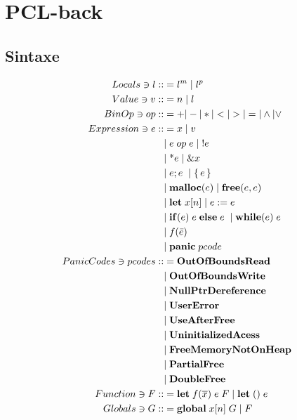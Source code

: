 \chapter{PCL-back}


\section{Sintaxe}
\begingroup
\setlength{\jot}{-0.2ex} 
	\begin{align*}
		Locals \ni l ::&= l^m \;|\; l^p &&\\ 
		Value \ni v ::&= n \;|\; l && \\
		BinOp \ni op ::&= + | - | * | < | > | = | \land | \lor \\
		Expression \ni e ::&= x \;|\; v \\
		&|\; e\; op\; e \;|\; !e  \\
		&|\; \text{*}e \;|\; \&x \\
		&|\; e;e \; \;|\; \{\,e\,\} \; \\ 
		&|\; \mathbf{malloc}(e) \;|\; \mathbf{free}(e, e) \; \\ 
		&|\; \mathbf{let}\; x[n] \;|\; e := e \; \\
		&|\; \mathbf{if}(e) \; e \; \mathbf{else} \; e \; \;|\; \mathbf{while}(e) \; e \\
		&|\; f(\bar e) \\ 
		&|\; \mathbf{panic}\;pcode \\ 
		PanicCodes \ni pcodes ::&= \mathbf{OutOfBoundsRead}\\
		&|\; \mathbf{OutOfBoundsWrite}\\
		&|\; \mathbf{NullPtrDereference}\\
		&|\; \mathbf{UserError}\\
		&|\; \mathbf{UseAfterFree}\\
		&|\; \mathbf{UninitializedAcess}\\
		&|\; \mathbf{FreeMemoryNotOnHeap}\\
		&|\; \mathbf{PartialFree}\\
		&|\; \mathbf{DoubleFree}\\
		Function \ni F ::&= \mathbf{let} \; f(\overline{x})\; e \; F \; | \; \mathbf{let}\;() \; e \\
		Globals \ni G ::&= \mathbf{global}\; x[n] \;G \;|\; F
	\end{align*}
\endgroup

